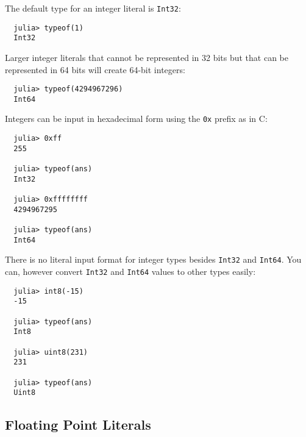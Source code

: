 \documentclass{article}
\begin{document}
The default type for an integer literal is \verb|Int32|:
\begin{verbatim}
  julia> typeof(1)
  Int32
\end{verbatim}
Larger integer literals that cannot be represented in 32 bits but that can be represented in 64 bits will create 64-bit integers:
\begin{verbatim}
  julia> typeof(4294967296)
  Int64
\end{verbatim}
Integers can be input in hexadecimal form using the \verb|0x| prefix as in C:
\begin{verbatim}
  julia> 0xff
  255

  julia> typeof(ans)
  Int32

  julia> 0xffffffff
  4294967295

  julia> typeof(ans)
  Int64
\end{verbatim}
There is no literal input format for integer types besides \verb|Int32| and \verb|Int64|. You can, however convert \verb|Int32| and \verb|Int64| values to other types easily:
\begin{verbatim}
  julia> int8(-15)
  -15

  julia> typeof(ans)
  Int8

  julia> uint8(231)
  231

  julia> typeof(ans)
  Uint8
\end{verbatim}

\subsection{Floating Point Literals}
\end{document}
